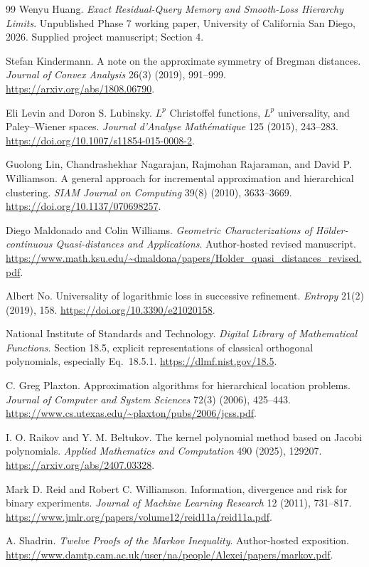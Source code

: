 \documentclass[11pt]{article}
\theoremstyle{definition}\newtheorem{definition}[theorem]{Definition}
\theoremstyle{remark}\newtheorem{remark}[theorem]{Remark}
\begin{document}
\begin{thebibliography}{99}
Wenyu Huang.
\emph{Exact Residual-Query Memory and Smooth-Loss Hierarchy Limits}.
Unpublished Phase 7 working paper, University of California San Diego, 2026.
Supplied project manuscript; Section 4.

Stefan Kindermann.
A note on the approximate symmetry of Bregman distances.
\emph{Journal of Convex Analysis} 26(3) (2019), 991--999.
\url{https://arxiv.org/abs/1808.06790}.

Eli Levin and Doron S. Lubinsky.
$L^p$ Christoffel functions, $L^p$ universality, and Paley--Wiener spaces.
\emph{Journal d'Analyse Math\'ematique} 125 (2015), 243--283.
\url{https://doi.org/10.1007/s11854-015-0008-2}.

Guolong Lin, Chandrashekhar Nagarajan, Rajmohan Rajaraman, and David P. Williamson.
A general approach for incremental approximation and hierarchical clustering.
\emph{SIAM Journal on Computing} 39(8) (2010), 3633--3669.
\url{https://doi.org/10.1137/070698257}.

Diego Maldonado and Colin Williams.
\emph{Geometric Characterizations of H\"older-continuous Quasi-distances and Applications}.
Author-hosted revised manuscript.
\url{https://www.math.ksu.edu/~dmaldona/papers/Holder_quasi_distances_revised.pdf}.

Albert No.
Universality of logarithmic loss in successive refinement.
\emph{Entropy} 21(2) (2019), 158.
\url{https://doi.org/10.3390/e21020158}.

National Institute of Standards and Technology.
\emph{Digital Library of Mathematical Functions}.
Section 18.5, explicit representations of classical orthogonal polynomials, especially Eq.~18.5.1.
\url{https://dlmf.nist.gov/18.5}.

C. Greg Plaxton.
Approximation algorithms for hierarchical location problems.
\emph{Journal of Computer and System Sciences} 72(3) (2006), 425--443.
\url{https://www.cs.utexas.edu/~plaxton/pubs/2006/jcss.pdf}.

I. O. Raikov and Y. M. Beltukov.
The kernel polynomial method based on Jacobi polynomials.
\emph{Applied Mathematics and Computation} 490 (2025), 129207.
\url{https://arxiv.org/abs/2407.03328}.

Mark D. Reid and Robert C. Williamson.
Information, divergence and risk for binary experiments.
\emph{Journal of Machine Learning Research} 12 (2011), 731--817.
\url{https://www.jmlr.org/papers/volume12/reid11a/reid11a.pdf}.

A. Shadrin.
\emph{Twelve Proofs of the Markov Inequality}.
Author-hosted exposition.
\url{https://www.damtp.cam.ac.uk/user/na/people/Alexei/papers/markov.pdf}.
\end{thebibliography}
\end{document}
